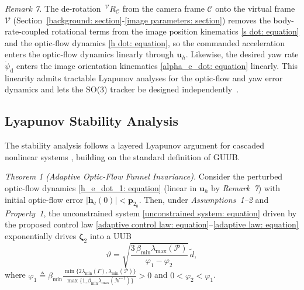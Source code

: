 \textit{Remark 7.} The de-rotation $\,^\mathcal{V}R_\mathcal{C}$ from the camera frame $\mathcal{C}$ onto the virtual frame $\mathcal{V}$ (Section~\ref{background: section}-\ref{image parameters: section}) removes the body-rate-coupled rotational terms from the image position kinematics \eqref{s dot: equation} and the optic-flow dynamics \eqref{h dot: equation}, so the commanded acceleration enters the optic-flow dynamics linearly through $\boldsymbol{u}_h$. Likewise, the desired yaw rate $\dot{\psi}_\text{d}$ enters the image orientation kinematics \eqref{alpha_e_dot: equation} linearly. This linearity admits tractable Lyapunov analyses for the optic-flow and yaw error dynamics and lets the SO(3) tracker be designed independently~\cite{fink2017, xie2016_2}.

\subsection{Lyapunov Stability Analysis} \label{stability: section}
The stability analysis follows a layered Lyapunov argument for cascaded nonlinear systems \cite{khalil2002}, building on the standard definition of GUUB.

\textit{Theorem 1 (Adaptive Optic-Flow Funnel Invariance).}
Consider the perturbed optic-flow dynamics \eqref{h_e_dot_1: equation} (linear in $\boldsymbol{u}_h$ by \textit{Remark~7}) with initial optic-flow error $|\boldsymbol{h}_\text{e}(0)|<\boldsymbol{p}_{2_0}$. Then, under \textit{Assumptions~1--2} and \textit{Property~1}, the unconstrained system \eqref{unconstrained system: equation} driven by the proposed control law \eqref{adaptive control law: equation}--\eqref{adaptive law: equation} exponentially drives $\boldsymbol{\zeta}_2$ into a UUB
\begin{equation} \label{UUB bound: equation}
    \vartheta = \sqrt{\frac{3\,\beta_{\min}\lambda_{\max}(\mathcal{P})}{\varphi_1-\varphi_2}}\,\tilde{d},
\end{equation}
where $\varphi_1 \triangleq \beta_{\min}\frac{\min\{2\lambda_{\min}(\Gamma),\lambda_{\min}(\mathcal{P})\}}{\max\{1,\beta_{\min}\lambda_{\max}(\mathcal{N}^{-1})\}}>0$ and $0<\varphi_2<\varphi_1$.

